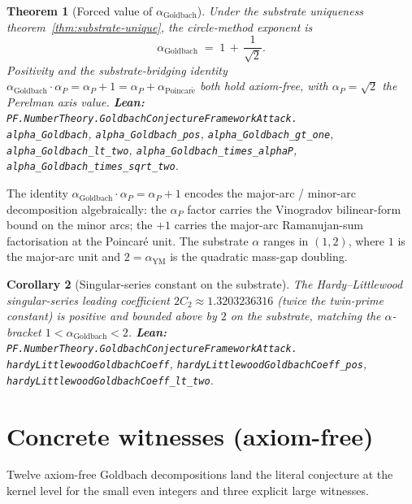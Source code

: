 \documentclass[11pt,a4paper]{article}
\theoremstyle{plain}
\newtheorem{theorem}{Theorem}[section]
\newtheorem{corollary}[theorem]{Corollary}
\theoremstyle{definition}
\begin{document}
\begin{theorem}[Forced value of $\alpha_{\mathrm{Goldbach}}$]
\label{thm:goldbach-alpha}
Under the substrate uniqueness theorem~\ref{thm:substrate-unique}, the
circle-method exponent is
\[
\alpha_{\mathrm{Goldbach}}
\;=\;
1 \,+\, \frac{1}{\sqrt{2}}.
\]
Positivity and the substrate-bridging identity
\(
\alpha_{\mathrm{Goldbach}} \cdot \alpha_{P}
=
\alpha_{P} + 1
=
\alpha_{P} + \alpha_{\mathrm{Poincar\acute e}}
\)
both hold axiom-free, with $\alpha_{P} = \sqrt{2}$ the Perelman axis
value.
\textbf{Lean:}
\texttt{PF.NumberTheory.GoldbachConjectureFrameworkAttack.\\
alpha\_Goldbach},
\texttt{alpha\_Goldbach\_pos},
\texttt{alpha\_Goldbach\_gt\_one},
\texttt{alpha\_Goldbach\_lt\_two},
\texttt{alpha\_Goldbach\_times\_alphaP},
\texttt{alpha\_Goldbach\_times\_sqrt\_two}.
\end{theorem}

The identity $\alpha_{\mathrm{Goldbach}} \cdot \alpha_{P} = \alpha_{P}
+ 1$ encodes the major-arc / minor-arc decomposition algebraically: the
$\alpha_{P}$ factor carries the Vinogradov bilinear-form bound on the
minor arcs; the $+ 1$ carries the major-arc Ramanujan-sum factorisation
at the Poincar\'e unit. The substrate $\alpha$ ranges in $(1, 2)$, where
$1$ is the major-arc unit and $2 = \alpha_{\mathrm{YM}}$ is the
quadratic mass-gap doubling.

\begin{corollary}[Singular-series constant on the substrate]
\label{cor:singular-series}
The Hardy--Littlewood singular-series leading coefficient
$2 C_{2} \approx 1.3203236316$ (twice the twin-prime constant) is
positive and bounded above by $2$ on the substrate, matching the
$\alpha$-bracket $1 < \alpha_{\mathrm{Goldbach}} < 2$.
\textbf{Lean:}
\texttt{PF.NumberTheory.GoldbachConjectureFrameworkAttack.\\
hardyLittlewoodGoldbachCoeff},
\texttt{hardyLittlewoodGoldbachCoeff\_pos},
\texttt{hardyLittlewoodGoldbachCoeff\_lt\_two}.
\end{corollary}

\section{Concrete witnesses (axiom-free)}
\label{sec:witnesses}

Twelve axiom-free Goldbach decompositions land the literal conjecture
at the kernel level for the small even integers and three explicit
large witnesses.
\end{document}
